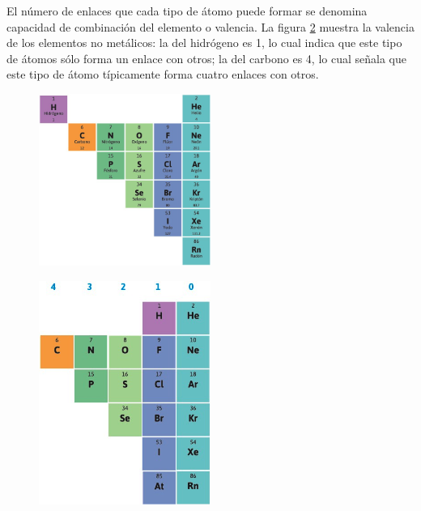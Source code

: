 \documentclass[11pt]{book}
\begin{document}
El número de enlaces que cada tipo de átomo puede
formar se denomina capacidad de combinación del elemento o valencia. La figura \ref{fig:valencia}
muestra la valencia de los elementos no metálicos: la del hidrógeno es 1, lo cual
indica que este tipo de átomos sólo forma un enlace con otros; la del carbono es 4,
lo cual señala que este tipo de átomo típicamente forma cuatro enlaces con otros.
\begin{minipage}{.4\textwidth}
  \begin{figure}[H]
    \centering
    \includegraphics[width=0.5\textwidth]{no_metales.jpg}
    \label{fig:no_metales}
  \end{figure}
\end{minipage}\hfill
\begin{minipage}{.4\textwidth}
  \begin{figure}[H]
    \centering
    \includegraphics[width=0.5\textwidth]{valencia.jpg}
    \label{fig:valencia}
  \end{figure}
\end{minipage}
\end{document}
